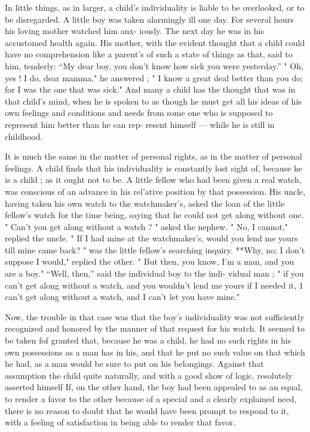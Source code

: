 \documentclass[
]{book}
\begin{document}
In little things, as in larger, a child's individuality is liable to be overlooked, or to be disregarded. A little boy was taken alarmingly ill one day. For several hours his loving mother watched him anx- iously. The next day he was in his accustomed health again. His mother, with the evident thought that a child could have no comprehension like a parent's of such a state of things as that, said to him, tenderly: ``My dear boy, you don't know how sick you were yesterday.'' " Oh, yes ! I do, dear mamma," he answered ; " I know a great deal better than you do; for I was the one that was sick." And many a child has the thought that was in that child's mind, when he is spoken to as though he must get all his ideas of his own feelings and conditions and needs from some one who is supposed to represent him better than he can rep- resent himself --- while he is still in childhood.

It is much the same in the matter of personal rights, as in the matter of personal feelings. A child finds that his individuality is constantly lost sight of, because he is a child ; as it ought not to be. A little fellow who had been given a real watch, was conscious of an advance in his rel'ative position by that possession. His uncle, having taken his own watch to the watchmaker's, asked the loan of the little fellow's watch for the time being, saying that he could not get along without one. " Can't you get along without a watch ? " asked the nephew. " No, I cannot," replied the uncle. " If I had mine at the watchmaker's, would you lend me yours till mine came back? " was the little fellow's searching inquiry. **Why, no; I don't suppose I would," replied the other. " But then, you know, I'm a man, and you are a boy." ``Well, then,'' said the individual boy to the indi- vidual man ; " if you can't get along without a watch, and you wouldn't lend me yours if I needed it, 1 can't get along without a watch, and I can't let you have mine."

Now, the trouble in that case was that the boy's individuality was not sufficiently recognized and honored by the manner of that request for his watch. It seemed to be taken fof granted that, because he was a child, he had no such rights in his own possessions as a man has in his, and that he put no such value on that which he had, as a man would be sure to put on his belongings. Against that assumption the child quite naturally, and with a good show of logic, resolutely asserted himself If, on the other hand, the boy had been appealed to as an equal, to render a favor to the other because of a special and a clearly explained need, there is no reason to doubt that he would have been prompt to respond to it, with a feeling of satisfaction in being able to render that favor.
\end{document}
